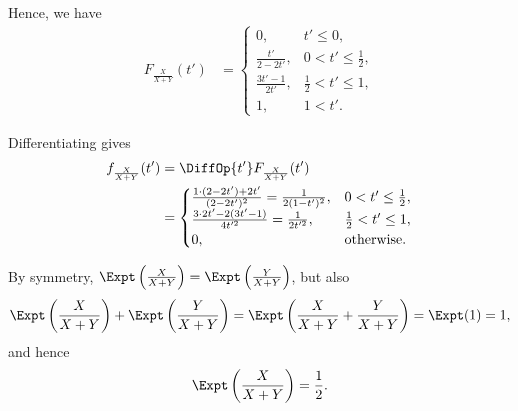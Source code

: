 \begin{enumerate}
          Hence, we have
          \begin{align*}
              F_{\frac{X}{X + Y}}(t') & = \begin{cases}
                                              0,                   & t' \leq 0,               \\
                                              \frac{t'}{2 - 2t'},  & 0 < t' \leq \frac{1}{2}, \\
                                              \frac{3t' - 1}{2t'}, & \frac{1}{2} < t' \leq 1, \\
                                              1,                   & 1 < t'.
                                          \end{cases}
          \end{align*}

          Differentiating gives
          \begin{align*}
              f_{\frac{X}{X + Y}}(t') & = \DiffOp{t'} F_{\frac{X}{X + Y}}(t')                                                               \\
                                      & = \begin{cases}
                                              \frac{1 \cdot (2 - 2t') + 2 t'}{(2 - 2t')^2} = \frac{1}{2 (1 - t')^2}, & 0 < t' \leq \frac{1}{2}, \\
                                              \frac{3 \cdot 2t' - 2 (3t' - 1)}{4t'^2} = \frac{1}{2 t'^2},            & \frac{1}{2} < t' \leq 1, \\
                                              0,                                                                     & \text{otherwise}.
                                          \end{cases}
          \end{align*}

          By symmetry, \(\Expt\left(\frac{X}{X + Y}\right) = \Expt\left(\frac{Y}{X + Y}\right)\), but also
          \[
              \Expt\left(\frac{X}{X + Y}\right) + \Expt\left(\frac{Y}{X + Y}\right) = \Expt\left(\frac{X}{X + Y} + \frac{Y}{X + Y}\right) = \Expt(1) = 1,
          \]
          and hence
          \[
              \Expt\left(\frac{X}{X + Y}\right) = \frac{1}{2}.
          \]


\end{enumerate}
